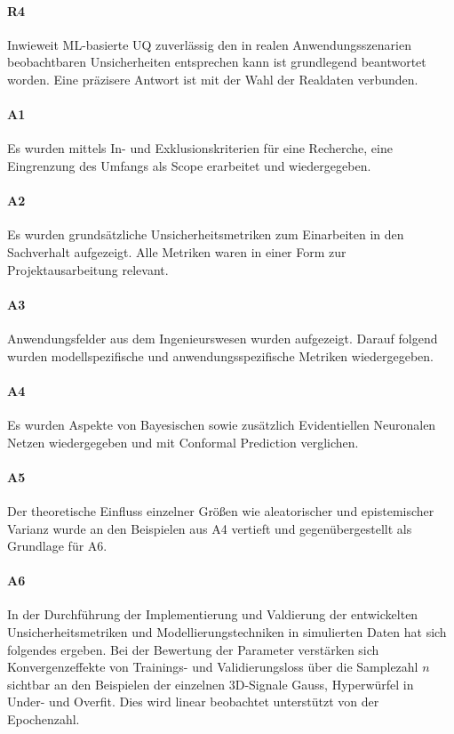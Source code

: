 \paragraph{R4} Inwieweit ML-basierte UQ zuverlässig den in realen Anwendungsszenarien beobachtbaren Unsicherheiten entsprechen kann ist grundlegend beantwortet worden. Eine präzisere Antwort ist mit der Wahl der Realdaten verbunden.  


\paragraph{A1} Es wurden mittels In- und Exklusionskriterien für eine Recherche, eine Eingrenzung des Umfangs als \glqq{}Scope\grqq{} erarbeitet und wiedergegeben.


\paragraph{A2} Es wurden grundsätzliche Unsicherheitsmetriken zum Einarbeiten in den Sachverhalt aufgezeigt. Alle Metriken waren in einer Form zur Projektausarbeitung relevant.  


\paragraph{A3} Anwendungsfelder aus dem Ingenieurswesen wurden aufgezeigt. Darauf folgend wurden modellspezifische und anwendungsspezifische Metriken wiedergegeben. 


\paragraph{A4} Es wurden Aspekte von Bayesischen sowie zusätzlich Evidentiellen Neuronalen Netzen wiedergegeben und mit Conformal Prediction verglichen. 


\paragraph{A5} Der theoretische Einfluss einzelner Größen wie aleatorischer und epistemischer Varianz wurde an den Beispielen aus A4 vertieft und gegenübergestellt als Grundlage für A6. 


\paragraph{A6} In der Durchführung der Implementierung und Valdierung der entwickelten Unsicherheitsmetriken und Modellierungstechniken in simulierten Daten hat sich folgendes ergeben. Bei der Bewertung der Parameter verstärken sich Konvergenzeffekte von Trainings- und Validierungsloss über die Samplezahl $n$ sichtbar an den Beispielen der einzelnen 3D-Signale Gauss, Hyperwürfel in Under- und Overfit. Dies wird linear beobachtet unterstützt von der Epochenzahl.

